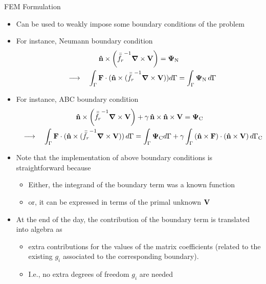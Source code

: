 \begin{frame}[allowframebreaks]{FEM Formulation}
    \begin{itemize}\setlength{\itemsep}{0.3\baselineskip}
    \item Can be used to weakly impose some boundary conditions of the problem

    \item For instance, Neumann boundary condition
        \begin{multline*}
          \mathbf{\hat{n}} \times \left( {\bar{\bar{f_r}}}^{-1} \boldsymbol{\nabla} \times \mathbf{V} \right) = \boldsymbol{\Psi}_\text{N} \\
          \quad \longrightarrow \quad
          \int_{\Gamma} \mathbf{F}\cdot(\mathbf{\hat{n}} \times ( {\bar{\bar{f_r}}}^{-1} \boldsymbol{\nabla} \times \mathbf{V} )) d\Gamma = \int_{\Gamma} \boldsymbol{\Psi}_\text{N} \,d\Gamma
        \end{multline*}

    \item For instance, ABC boundary condition
      \begin{multline*}
          \mathbf{\hat{n}} \times \left( {\bar{\bar{f_r}}}^{-1} \boldsymbol{\nabla} \times \mathbf{V} \right) + \gamma\, \mathbf{\hat{n}} \times \mathbf{\hat{n}} \times \mathbf{V} = \boldsymbol{\Psi}_\text{C}
          \\ \quad \longrightarrow \quad
          \int_{\Gamma} \mathbf{F}\cdot(\mathbf{\hat{n}} \times ( {\bar{\bar{f_r}}}^{-1} \boldsymbol{\nabla} \times \mathbf{V} )) \,d\Gamma
          = \int_{\Gamma} \boldsymbol{\Psi}_\text{C} d\Gamma
          + \gamma \int_{\Gamma} \left( \mathbf{\hat{n}} \times \mathbf{F} \right) \cdot \left( \mathbf{\hat{n}} \times \mathbf{V} \right) d\Gamma_\text{C}
        \end{multline*}
      
      \framebreak  %
      
      
    \item Note that the implementation of above boundary conditions is
      straightforward because 
      \begin{itemize}
      \item Either, the integrand of the boundary term was a known function

        
      \item or, it can be expressed in terms of the primal unknown
        $\mathbf{V}$

      \end{itemize}

    \item At the end of the day, the contribution of the boundary term
      is translated into algebra as
      \begin{itemize}
      \item extra contributions for the values of the matrix
        coefficients (related to the existing $g_i$ associated to the
        corresponding boundary).
      \item I.e., no extra degrees of freedom $g_i$ are needed
      \end{itemize}
      \vbs
      

\end{itemize}
\end{frame}
